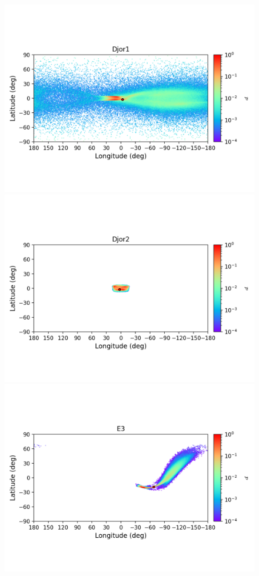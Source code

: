         \begin{figure}
        \includegraphics[clip=true, trim = 0mm 20mm 0mm 10mm, width=1\columnwidth]{images/error_plots_Djor1.png}
        \includegraphics[clip=true, trim = 0mm 20mm 0mm 10mm, width=1\columnwidth]{images/error_plots_Djor2.png}
        \includegraphics[clip=true, trim = 0mm 20mm 0mm 10mm, width=1\columnwidth]{images/error_plots_E3.png}

\end{figure}
